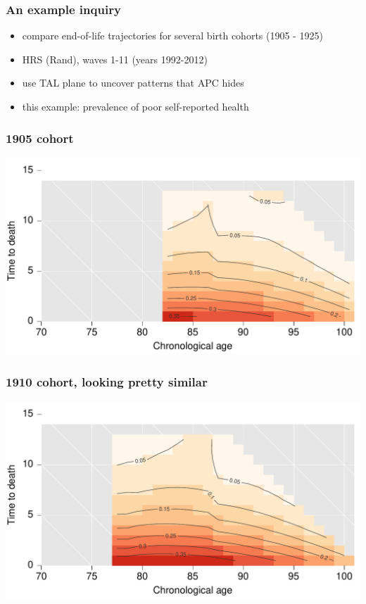 \documentclass[20pt]{beamer}
\begin{document}

\begin{frame}
\frametitle{An example inquiry}
\normalsize
\begin{itemize}[<+->]
  \item compare end-of-life trajectories for several birth cohorts (1905 - 1925)
  \item HRS (Rand), waves 1-11 (years 1992-2012)
  \item use TAL plane to uncover patterns that APC hides
  \item this example: prevalence of poor self-reported health
\end{itemize}
\end{frame}


\begin{frame}
\frametitle{1905 cohort}
\vspace{-4em}
\begin{center}
\includegraphics[scale=1]{Figures/srhpoor1905.pdf}
\end{center}
\end{frame}


\begin{frame}
\frametitle{1910 cohort, looking pretty similar}
\vspace{-4em}
\begin{center}
\includegraphics[scale=1]{Figures/srhpoor1910.pdf}
\end{center}
\end{frame}
\end{document}
